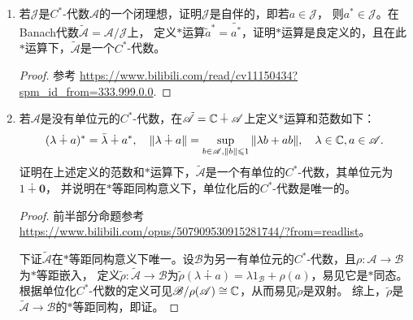 \begin{enumerate}
\item[6] 若$\mathscr{J}$是$C^*$-代数$\mathscr{A}$的一个闭理想，证明$\mathscr{J}$是自伴的，即若$a\in\mathscr{J}$，
则$a^*\in\mathscr{J}$。在Banach代数$\tilde{\mathscr{A}}=\mathscr{A}/\mathscr{J}$上，
定义$*$运算$\tilde{a}^*=\widetilde{a^*}$，证明$*$运算是良定义的，且在此$*$运算下，$\tilde{\mathscr{A}}$是一个$C^*$-代数。
\begin{proof}
参考 \url{https://www.bilibili.com/read/cv11150434?spm_id_from=333.999.0.0}.
\end{proof}

\item[7] 若$\mathscr{A}$是没有单位元的$C^*$-代数，在$\tilde{\mathscr{A}}=\mathbb{C}\dotplus\mathscr{A}$上定义$*$运算和范数如下：
\[(\lambda\dotplus a)^*=\bar{\lambda}\dotplus a^*,\quad\|\lambda\dotplus a\|=\sup_{b\in\mathscr{A},\|b\|\leqslant1}\|\lambda b+ab\|,\quad\lambda\in\mathbb{C},a\in\mathscr{A}.\]
证明在上述定义的范数和$*$运算下，$\tilde{\mathscr{A}}$是一个有单位的$C^*$-代数，其单位元为$1\dotplus\bm{0}$，
并说明在$*$等距同构意义下，单位化后的$C^*$-代数是唯一的。
\begin{proof}
    前半部分命题参考 \url{https://www.bilibili.com/opus/507909530915281744/?from=readlist}。

    下证$\tilde{\mathscr{A}}$在$*$等距同构意义下唯一。设$\mathscr{B}$为另一有单位元的$C^*$-代数，且$\rho:\mathscr{A}\to\mathscr{B}$为$*$等距嵌入，
    定义$\tilde{\rho}:\tilde{\mathscr{A}}\to\mathscr{B}$为$\tilde{\rho}(\lambda\dotplus a)=\lambda1_{\mathscr{B}}+\rho(a)$，易见它是$*$同态。
    根据单位化$C^*$-代数的定义可见$\mathscr{B}/\rho(\mathscr{A})\cong\mathbb{C}$，从而易见$\tilde{\rho}$是双射。
    综上，$\tilde{\rho}$是$\tilde{\mathscr{A}}\to\mathscr{B}$的$*$等距同构，即证。
\end{proof}
\end{enumerate}

